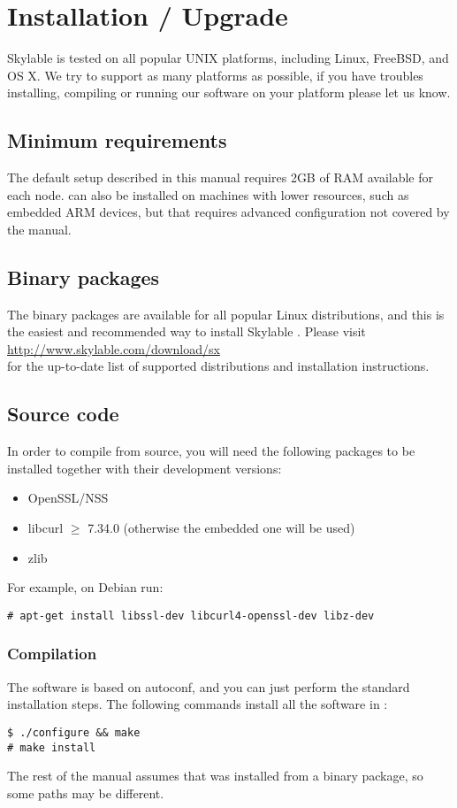 \chapter{Installation / Upgrade}

Skylable \SX is tested on all popular UNIX platforms, including Linux,
FreeBSD, and OS X. We try to support as many platforms as possible,
if you have troubles installing, compiling or running our software on
your platform please let us know.

\section{Minimum requirements}
The default setup described in this manual requires 2GB of RAM available
for each node. \SX can also be installed on machines with lower resources,
such as embedded ARM devices, but that requires advanced configuration not
covered by the manual.

\section{Binary packages}
The binary packages are available for all popular Linux distributions,
and this is the easiest and recommended way to install Skylable \SX.
Please visit\\
\url{http://www.skylable.com/download/sx}\\
for the up-to-date list of supported distributions and installation instructions.

\section{Source code}
In order to compile \SX from source, you will need the following packages to
be installed together with their development versions:
\begin{itemize}
    \item OpenSSL/NSS
    \item libcurl $\ge$ 7.34.0 (otherwise the embedded one will be used)
    \item zlib
\end{itemize}
For example, on Debian run:
\begin{lstlisting}
# apt-get install libssl-dev libcurl4-openssl-dev libz-dev
\end{lstlisting}

\subsection{Compilation}
The software is based on autoconf, and you can just perform the standard
installation steps. The following commands install all the software in
:
\begin{lstlisting}
$ ./configure && make
# make install
\end{lstlisting}
The rest of the manual assumes that \SX was installed from a binary
package, so some paths may be different.

